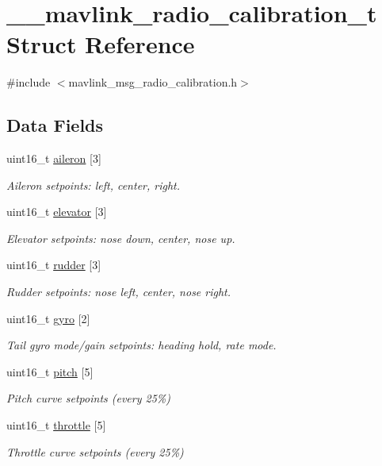 \hypertarget{struct____mavlink__radio__calibration__t}{\section{\+\_\+\+\_\+mavlink\+\_\+radio\+\_\+calibration\+\_\+t Struct Reference}
\label{struct____mavlink__radio__calibration__t}
}


{\ttfamily \#include $<$mavlink\+\_\+msg\+\_\+radio\+\_\+calibration.\+h$>$}

\subsection*{Data Fields}
\begin{DoxyCompactItemize}
\item 
uint16\+\_\+t \hyperlink{struct____mavlink__radio__calibration__t_aa29e3b252970fbe7d9394295288c704a}{aileron} \mbox{[}3\mbox{]}
\begin{DoxyCompactList}\small\item\em Aileron setpoints\+: left, center, right. \end{DoxyCompactList}\item 
uint16\+\_\+t \hyperlink{struct____mavlink__radio__calibration__t_a0ae0f804947ddcbc22ab48419df28b41}{elevator} \mbox{[}3\mbox{]}
\begin{DoxyCompactList}\small\item\em Elevator setpoints\+: nose down, center, nose up. \end{DoxyCompactList}\item 
uint16\+\_\+t \hyperlink{struct____mavlink__radio__calibration__t_aa620c57cf3f9f311f7900b9afd6d1e89}{rudder} \mbox{[}3\mbox{]}
\begin{DoxyCompactList}\small\item\em Rudder setpoints\+: nose left, center, nose right. \end{DoxyCompactList}\item 
uint16\+\_\+t \hyperlink{struct____mavlink__radio__calibration__t_adacea0688be19a8f307227f85c6e9d3e}{gyro} \mbox{[}2\mbox{]}
\begin{DoxyCompactList}\small\item\em Tail gyro mode/gain setpoints\+: heading hold, rate mode. \end{DoxyCompactList}\item 
uint16\+\_\+t \hyperlink{struct____mavlink__radio__calibration__t_adb1f8ceaeecadcb83de5976f03cb7774}{pitch} \mbox{[}5\mbox{]}
\begin{DoxyCompactList}\small\item\em Pitch curve setpoints (every 25\%) \end{DoxyCompactList}\item 
uint16\+\_\+t \hyperlink{struct____mavlink__radio__calibration__t_ab7f88c470d8c7fc6be72399aa6f75540}{throttle} \mbox{[}5\mbox{]}
\begin{DoxyCompactList}\small\item\em Throttle curve setpoints (every 25\%) \end{DoxyCompactList}\end{DoxyCompactItemize}


